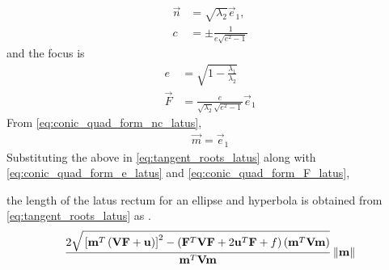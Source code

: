 \documentclass[journal,12pt,twocolumn]{IEEEtran}
\renewcommand\thesection{\arabic{section}}
\renewcommand\thesubsection{\thesection.\arabic{subsection}}
\begin{document}
\begin{enumerate}[label=\thesubsection.\arabic*.,ref=\thesubsection.\theenumi]
\begin{enumerate}
\begin{align}
\label{eq:conic_quad_form_nc_latus} 
  \vec{n}&= \sqrt{\lambda_2}\vec{e}_1,  
  \\
	c &=	\pm   \frac{ 1 }{e\sqrt{e^2-1} }
\end{align}  
and the focus is 
\begin{align}
  \label{eq:conic_quad_form_e_latus} 
  e&= \sqrt{1-\frac{\lambda_1}{\lambda_2}}
  \\
  \label{eq:conic_quad_form_F_latus} 
	\vec{F}  &= \frac{ e  }{\sqrt{\lambda_2}\sqrt{e^2-1}}\vec{e}_1
\end{align}  
From \eqref{eq:conic_quad_form_nc_latus},  
\begin{align}  
	\vec{m} = \vec{e}_1
\end{align}  
Substituting the above in 
\eqref{eq:tangent_roots_latus} along with
  \eqref{eq:conic_quad_form_e_latus} and  
  \eqref{eq:conic_quad_form_F_latus}, 


	the length of the latus rectum for an ellipse and hyperbola is obtained from 
\eqref{eq:tangent_roots_latus} as .
	{\tiny
\begin{multline}
 \frac{2\sqrt{
{}\left[
\mathbf{m}^T\left(\mathbf{V}\mathbf{F}+\mathbf{u}\right)
\right]^2
-
\left(
\mathbf{F}^T\mathbf{V}\mathbf{F} + 2\mathbf{u}^T\mathbf{F} +f
\right)
\left(\mathbf{m}^T\mathbf{V}\mathbf{m}\right)
}
}
{
\mathbf{m}^T\mathbf{V}\mathbf{m}
}\left\lVert\mathbf{m}\right\rVert
\end{multline}
}


\end{enumerate}
\end{enumerate}
\end{document}
